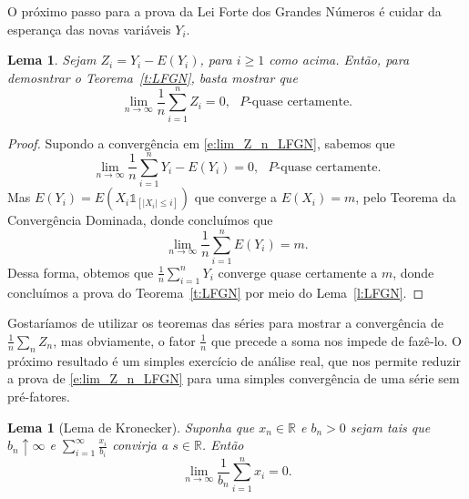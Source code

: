 \documentclass[reqno, final]{book}
\newcommand*\1{\mathds{1}}
\newtheorem{lemma}[theorem]{Lema}
\begin{document}
O próximo passo para a prova da Lei Forte dos Grandes Números é cuidar da esperança das novas variáveis $Y_i$.
\begin{lemma}
  \label{l:lim_Z_n_LFGN}
  Sejam $Z_i = Y_i - E(Y_i)$, para $i \geq 1$ como acima.
  Então, para demosntrar o Teorema~\ref{t:LFGN}, basta mostrar que
  \begin{equation}
    \label{e:lim_Z_n_LFGN}
    \lim_{n \to \infty}\frac{1}{n} \sum_{i=1}^n Z_i = 0, \text{ $P$-quase certamente.}
  \end{equation}
\end{lemma}

\begin{proof}
  Supondo a convergência em \eqref{e:lim_Z_n_LFGN}, sabemos que
  \begin{equation}
    \lim_{n \to \infty} \frac{1}{n} \sum_{i=1}^n Y_i - E(Y_i) = 0, \text{ $P$-quase certamente.}
  \end{equation}
  Mas $E(Y_i) = E(X_i \1_{[|X_i| \leq i]})$ que converge a $E(X_i) = m$, pelo Teorema da Convergência Dominada, donde concluímos que
  \begin{equation}
    \lim_{n \to \infty} \frac{1}{n} \sum_{i=1}^n E(Y_i) = m.
  \end{equation}
  Dessa forma, obtemos que $\tfrac 1n \sum_{i=1}^n Y_i$ converge quase certamente a $m$, donde concluímos a prova do Teorema~\ref{t:LFGN} por meio do Lema~\ref{l:LFGN}.
\end{proof}

Gostaríamos de utilizar os teoremas das séries para mostrar a convergência de $\tfrac 1n \sum_{n} Z_n$, mas obviamente, o fator $\tfrac 1n$ que precede a soma nos impede de fazê-lo.
O próximo resultado é um simples exercício de análise real, que nos permite reduzir a prova de \eqref{e:lim_Z_n_LFGN} para uma simples convergência de uma série sem pré-fatores.

\begin{lemma}[Lema de Kronecker]
  Suponha que $x_n \in \mathbb{R}$ e $b_n > 0$ sejam tais que $b_n \uparrow \infty$ e $\sum_{i=1}^\infty \frac{x_i}{b_i}$ convirja a $s \in \mathbb{R}$.
  Então
  \begin{equation}
    \lim_{n \to \infty} \frac{1}{b_n} \sum_{i=1}^n x_i = 0.
  \end{equation}
\end{lemma}
\end{document}
